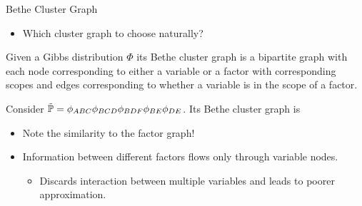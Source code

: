 \begin{frame}{Bethe Cluster Graph}
\begin{itemize}
    \item Which cluster graph to choose naturally?
\end{itemize}
\pause
    \begin{definition}
        \label{def:bethe-cluster-graph}
    Given a Gibbs distribution $\Phi$ its Bethe cluster graph is a bipartite graph with 
        each node corresponding to either a variable or a factor with corresponding scopes and
        edges corresponding to whether a variable is in the scope of a factor.
    \end{definition}
\pause
\begin{example}
   Consider $\tilde{\Pb} = \phi_{ABC} \phi_{BCD} \phi_{BDF} \phi_{BE} \phi_{DE}$.
   Its Bethe cluster graph is
\begin{center}
\end{center}
\end{example}
\begin{itemize}
    \pause \item Note the similarity to the factor graph!
    \pause \item Information between different factors flows only through variable nodes.
    \begin{itemize}
        \pause \item Discards interaction between multiple variables and leads to poorer approximation.
    \end{itemize}
\end{itemize}
\end{frame}

